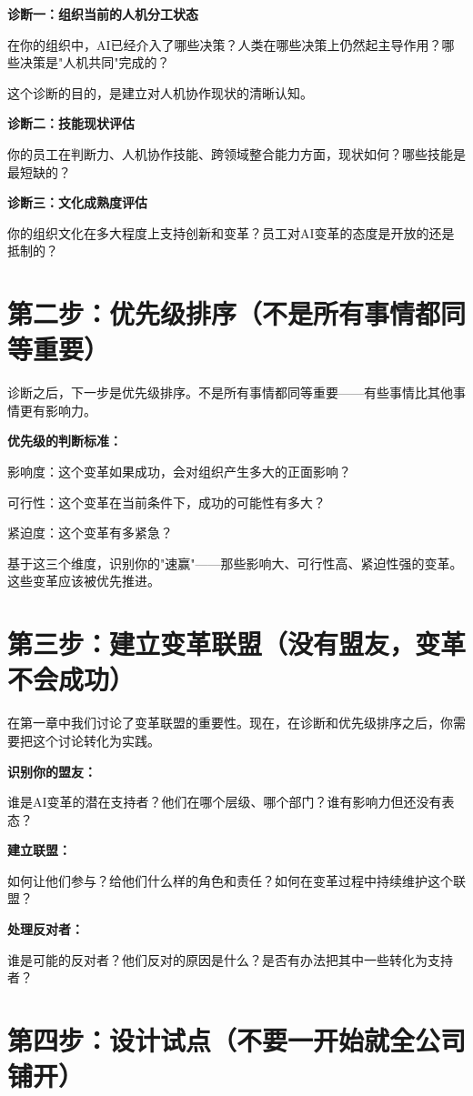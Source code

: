 \textbf{诊断一：组织当前的人机分工状态}

在你的组织中，AI已经介入了哪些决策？人类在哪些决策上仍然起主导作用？哪些决策是"人机共同"完成的？

这个诊断的目的，是建立对人机协作现状的清晰认知。

\textbf{诊断二：技能现状评估}

你的员工在判断力、人机协作技能、跨领域整合能力方面，现状如何？哪些技能是最短缺的？

\textbf{诊断三：文化成熟度评估}

你的组织文化在多大程度上支持创新和变革？员工对AI变革的态度是开放的还是抵制的？

\section{第二步：优先级排序（不是所有事情都同等重要）}


诊断之后，下一步是优先级排序。不是所有事情都同等重要——有些事情比其他事情更有影响力。

\textbf{优先级的判断标准：}

影响度：这个变革如果成功，会对组织产生多大的正面影响？

可行性：这个变革在当前条件下，成功的可能性有多大？

紧迫度：这个变革有多紧急？

基于这三个维度，识别你的"速赢"——那些影响大、可行性高、紧迫性强的变革。这些变革应该被优先推进。

\section{第三步：建立变革联盟（没有盟友，变革不会成功）}


在第一章中我们讨论了变革联盟的重要性。现在，在诊断和优先级排序之后，你需要把这个讨论转化为实践。

\textbf{识别你的盟友：}

谁是AI变革的潜在支持者？他们在哪个层级、哪个部门？谁有影响力但还没有表态？

\textbf{建立联盟：}

如何让他们参与？给他们什么样的角色和责任？如何在变革过程中持续维护这个联盟？

\textbf{处理反对者：}

谁是可能的反对者？他们反对的原因是什么？是否有办法把其中一些转化为支持者？

\section{第四步：设计试点（不要一开始就全公司铺开）}


